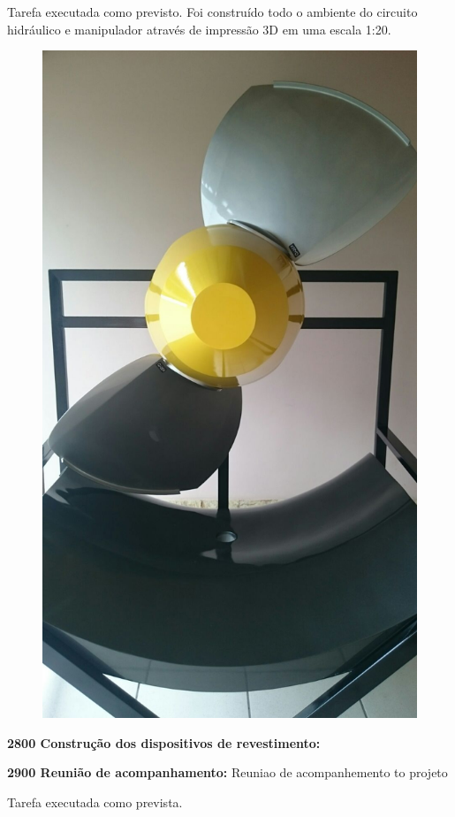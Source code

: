 Tarefa executada como previsto. Foi construído todo o ambiente do circuito
hidráulico e manipulador através de impressão 3D em uma escala 1:20.

\begin{figure}\centering
\includegraphics[width=0.9\columnwidth]{figs/Maquete_03}
\end{figure}   

\textbf{2800 Construção dos dispositivos de revestimento:} %

\textbf{2900 Reunião de acompanhamento:} Reuniao de acompanhemento to projeto

Tarefa executada como prevista. 

